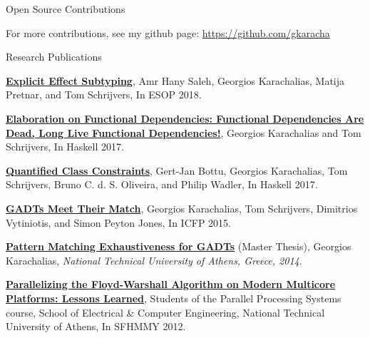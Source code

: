 \documentclass{resume} %
\begin{document}
\begin{rSection}{Open Source Contributions}


For more contributions, see my github page: \href{https://github.com/gkaracha}{https://github.com/gkaracha}

\end{rSection}



\begin{rSection}{Research Publications}

{\bf \href{https://people.cs.kuleuven.be/~george.karachalias/papers/skeletons.pdf}
          {Explicit Effect Subtyping}},
Amr Hany Saleh, Georgios Karachalias, Matija Pretnar, and Tom Schrijvers, In ESOP 2018.

{\bf \href{https://people.cs.kuleuven.be/~george.karachalias/papers/fundeps.pdf}
          {Elaboration on Functional Dependencies: Functional Dependencies Are Dead, Long Live Functional Dependencies!}},
Georgios Karachalias and Tom Schrijvers, In Haskell 2017.

{\bf \href{https://people.cs.kuleuven.be/~george.karachalias/papers/quantcs.pdf}
          {Quantified Class Constraints}},
Gert-Jan Bottu, Georgios Karachalias, Tom Schrijvers, Bruno C. d. S. Oliveira,
and Philip Wadler, In Haskell 2017.

{\bf \href{http://people.cs.kuleuven.be/~george.karachalias/papers/p424-karachalias.pdf}
          {GADTs Meet Their Match}},
Georgios Karachalias, Tom Schrijvers, Dimitrios Vytiniotis, and Simon Peyton
Jones, In ICFP 2015.

{\bf \href{https://dspace.lib.ntua.gr/dspace2/bitstream/handle/123456789/38413/karachaliasg_exhaustiveness.pdf?sequence=1}
          {Pattern Matching Exhaustiveness for GADTs}} (Master Thesis),
Georgios Karachalias, {\em National Technical University of Athens, Greece, 2014}.

{\bf \href{http://people.cs.kuleuven.be/~george.karachalias/papers/floyd-warshall.pdf}
          {Parallelizing the Floyd-Warshall Algorithm on Modern Multicore Platforms: Lessons Learned}},
Students of the Parallel Processing Systems course,
School of Electrical \& Computer Engineering,
National Technical University of Athens, In SFHMMY 2012.

\end{rSection}
\end{document}
